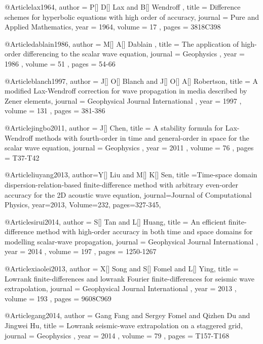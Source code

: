 {@Article{lax1964,
 author =  { P[] D[] Lax and B[] Wendroff },
 title =   {Difference schemes for hyperbolic equations with high order of accuracy},
 journal = { Pure and Applied Mathematics},
 year =    { 1964},
 volume =  { 17 },
 pages =   { 381\A8C398 }
}

@Article{dablain1986,
 author =  { M[] A[] Dablain },
 title =   {The application of high-order differencing to the scalar wave equation},
 journal = { Geophysics },
 year =    { 1986 },
 volume =  { 51 },
 pages =   { 54-66 }
}


@Article{blanch1997,
 author =  { J[] O[] Blanch and J[] O[] A[] Robertson},
 title =   {A modified Lax-Wendroff correction for wave propagation in media described by Zener elements},
 journal = { Geophysical Journal International },
 year =    { 1997 },
 volume =  { 131 },
 pages =   { 381-386 }
}

@Article{jingbo2011,
 author =  { J[] Chen},
 title =   {A stability formula for Lax-Wendroff methods with fourth-order in time and general-order in space for the scalar wave equation},
 journal = { Geophysics },
 year =    { 2011 },
 volume =  { 76 },
 pages =   { T37-T42 }
}

@Article{liuyang2013,
  author={Y[] Liu and M[] K[] Sen},
  title ={Time-space domain dispersion-relation-based finite-difference method with arbitrary even-order accuracy for the 2{D} acoustic wave equation},
  journal={Journal of Computational Physics},
  year=2013,
  Volume=232,
  pages={327-345},
}






@Article{sirui2014,
 author =  { S[] Tan and L[] Huang},
 title =   {An efficient finite-difference method with high-order accuracy in both time and space domains for modelling scalar-wave propagation},
 journal = { Geophysical Journal International },
 year =    { 2014 },
 volume =  { 197 },
 pages =   { 1250-1267 }
}

@Article{xiaolei2013,
 author =  { X[] Song and S[] Fomel and L[] Ying},
 title =   {Lowrank finite-differences and lowrank Fourier finite-differences for seismic wave extrapolation},
 journal = { Geophysical Journal International },
 year =    { 2013 },
 volume =  { 193 },
 pages =   { 960\A8C969 }
}

@Article{gang2014,
 author =  { Gang Fang and Sergey Fomel and Qizhen Du and Jingwei Hu},
 title =   {Lowrank seismic-wave extrapolation on a staggered grid},
 journal = { Geophysics },
 year =    { 2014 },
 volume =  { 79 },
 pages =   { T157-T168}
}


}
